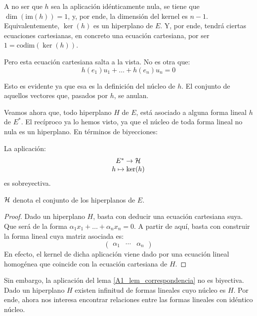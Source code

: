 A no ser que $h$ sea la aplicación idénticamente nula, se tiene que $\dim(\mathrm{im}(h))=1$, y, por ende, la dimensión del kernel es $n-1$. Equivalentemente, $\ker(h)$ es un hiperplano de $E$. Y, por ende, tendrá ciertas ecuaciones cartesianas, en concreto una ecuación cartesiana, por ser $1=\mathrm{codim}(\ker(h))$.

Pero esta ecuación cartesiana salta a la vista. No es otra que:
\[h(e_1)u_1+\dots+h(e_n)u_n=0\]

Esto es evidente ya que esa es la definición del núcleo de $h$. El conjunto de aquellos vectores que, pasados por $h$, se anulan.

Veamos ahora que, todo hiperplano $H$ de $E$, está asociado a alguna forma lineal $h$ de $E^*$. El recíproco ya lo hemos visto, ya que el núcleo de toda forma lineal no nula es un hiperplano. En términos de biyecciones:
\begin{lem}
	\label{A1_lem_correspondencia}
	La aplicación:
	\[\begin{array}{c}
	E^*\to\mathcal{H}\\
	h\mapsto \ker(h)
	\end{array}\]
	es sobreyectiva.
	
	$\mathcal{H}$ denota el conjunto de los hiperplanos de $E$.
\end{lem}
\begin{proof}
	Dado un hiperplano $H$, basta con deducir una ecuación cartesiana suya. Que será de la forma $\alpha_1x_1+\dots+\alpha_nx_n=0$. A partir de aquí, basta con construir la forma lineal cuya matriz asociada es:
	\[\begin{pmatrix}
	\alpha_1 & \cdots & \alpha_n
	\end{pmatrix}\]
	En efecto, el kernel de dicha aplicación viene dado por una ecuación lineal homogénea que coincide con la ecuación cartesiana de $H$.
\end{proof}

Sin embargo, la aplicación del lema \ref{A1_lem_correspondencia} no es biyectiva. Dado un hiperplano $H$ existen infinitud de formas lineales cuyo núcleo es $H$. Por ende, ahora nos interesa encontrar relaciones entre las formas lineales con idéntico núcleo.

